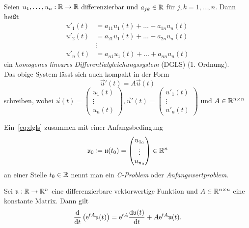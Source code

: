 \begin{definition}
    Seien $u_1,\dots,u_n: \mathbb{R} \to \mathbb{R}$ differenzierbar und $a_{jk} \in \mathbb{R}$ für $j,k = 1,\dots,n$.
    Dann heißt
    \begin{equation*}
        \begin{aligned}
            u'_1(t) &= a_{11} u_1(t) + \dots + a_{1n} u_n(t)\\
            u'_2(t) &= a_{21} u_1(t) + \dots + a_{2n} u_n(t)\\
            &\vdots\\
            u'_n(t) &= a_{n1} u_1(t) + \dots + a_{nn} u_n(t)
        \end{aligned}
    \end{equation*}
    ein \emph{homogenes lineares Differentialgleichungssystem} (DGLS) (1. Ordnung).\\
    Das obige System lässt sich auch kompakt in der Form
    \begin{equation}\tag{DGLS}\label{eq:dgls}
        \vec{u}'(t) = A \vec{u}(t)
    \end{equation}
    schreiben, wobei $\vec{u}(t) = \begin{pmatrix} u_1(t)\\ \vdots\\ u_n(t) \end{pmatrix}, \vec{u}'(t) = \begin{pmatrix} u'_1(t)\\ \vdots\\ u'_n(t) \end{pmatrix}$
    und $A \in \mathbb{R}^{n \times n}$
\end{definition}

\begin{definition}
    Ein~\ref{eq:dgls} zusammen mit einer Anfangsbedingung
    \begin{equation*}
        \mathfrak{u}_0 \coloneqq \mathfrak{u}(t_0) = \begin{pmatrix} u_{1_0}\\ \vdots\\ u_{n_0} \end{pmatrix} \in \mathbb{R}^n
    \end{equation*}
    an einer Stelle $t_0 \in \mathbb{R}$ nennt man ein \emph{C-Problem} oder \emph{Anfangswertproblem}.
\end{definition}

\begin{lemma}[Produktregel]\label{thm:matrixexp-derivative}
    Sei $\mathfrak{u}: \mathbb{R} \to \mathbb{R}^{n}$ eine differenzierbare vektorwertige Funktion und $A \in \mathbb{R}^{n \times n}$ eine konstante Matrix.
    Dann gilt
    \begin{equation*}
        \frac{\mathrm{d} }{\mathrm{d} t} \left( \mathrm{e}^{t A} \mathfrak{u}(t) \right) = \mathrm{e}^{t A} \frac{\mathrm{d} \mathfrak{u}(t)}{\mathrm{d} t} + A \mathrm{e}^{t A} \mathfrak{u}(t).
    \end{equation*}
\end{lemma}

